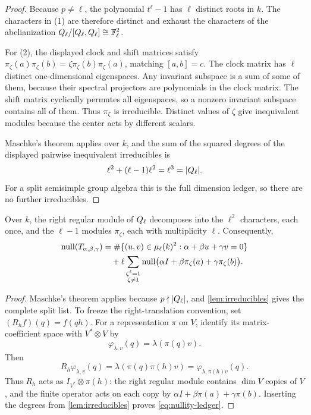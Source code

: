 \begin{proof}
Because $p\ne\ell$, the polynomial $t^\ell-1$ has $\ell$ distinct roots in
$k$.  The characters in (1) are therefore distinct and exhaust the
characters of the abelianization $Q_\ell/[Q_\ell,Q_\ell]\cong\mathbb F_\ell^2$.

For (2), the displayed clock and shift matrices satisfy
$\pi_\zeta(a)\pi_\zeta(b)=
\zeta\pi_\zeta(b)\pi_\zeta(a)$, matching $[a,b]=c$.  The clock matrix has
$\ell$ distinct one-dimensional eigenspaces.  Any invariant subspace is a
sum of some of them, because their spectral projectors are polynomials in
the clock matrix.  The shift matrix cyclically permutes all eigenspaces, so
a nonzero invariant subspace contains all of them.  Thus $\pi_\zeta$ is
irreducible.  Distinct values of $\zeta$ give inequivalent modules because
the center acts by different scalars.

Maschke's theorem applies over $k$, and the sum of the squared degrees of the
displayed pairwise inequivalent irreducibles is
\[
 \ell^2+(\ell-1)\ell^2=\ell^3=|Q_\ell|.
\]
For a split semisimple group algebra this is the full dimension ledger, so
there are no further irreducibles.
\end{proof}

\begin{proposition}\label{prop:regular-ledger}
Over $k$, the right regular module of $Q_\ell$ decomposes into the $\ell^2$
characters, each once, and the $\ell-1$ modules $\pi_\zeta$, each with
multiplicity $\ell$.  Consequently,
\begin{align}\label{eq:nullity-ledger}
 \operatorname{null}(T_{\alpha,\beta,\gamma})
 &=\#\{(u,v)\in\mu_\ell(k)^2:
             \alpha+\beta u+\gamma v=0\}\notag\\
 &\quad+\ell\sum_{\substack{\zeta^\ell=1\\\zeta\ne1}}
  \operatorname{null}\bigl(\alpha I+\beta\pi_\zeta(a)
                         +\gamma\pi_\zeta(b)\bigr).
\end{align}
\end{proposition}

\begin{proof}
Maschke's theorem applies because $p\nmid|Q_\ell|$, and
\cref{lem:irreducibles} gives the complete split list.  To freeze the
right-translation convention, set
$(R_hf)(q)=f(qh)$.  For a representation $\pi$ on $V$, identify its matrix-
coefficient space with $V^*\otimes V$ by
\[
 \varphi_{\lambda,v}(q)=\lambda(\pi(q)v).
\]
Then
\[
 R_h\varphi_{\lambda,v}(q)
 =\lambda(\pi(q)\pi(h)v)
 =\varphi_{\lambda,\pi(h)v}(q).
\]
Thus $R_h$ acts as $I_{V^*}\otimes\pi(h)$: the right regular module contains
$\dim V$ copies of $V$, and the finite operator acts on each copy by
$\alpha I+\beta\pi(a)+\gamma\pi(b)$.  Inserting the degrees from
\cref{lem:irreducibles} proves \eqref{eq:nullity-ledger}.
\end{proof}

